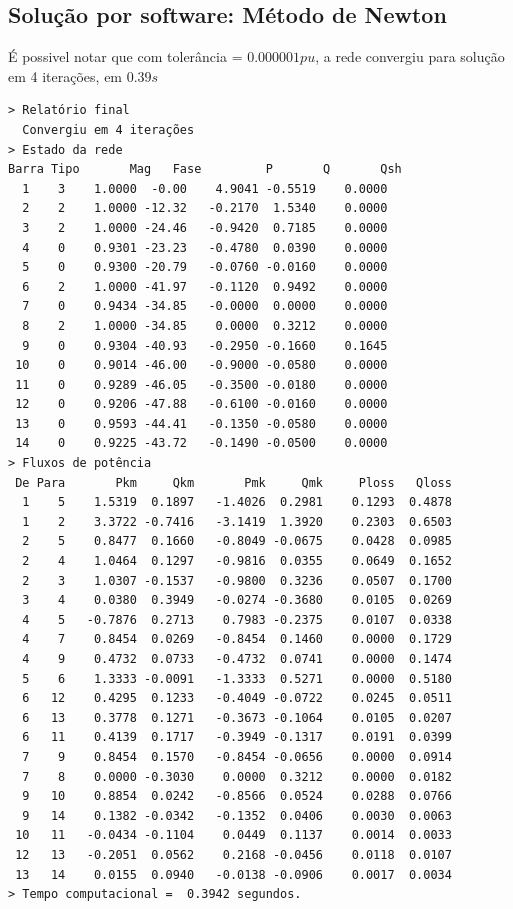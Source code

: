 \subsection{Solução por software: Método de Newton}
É possivel notar que com tolerância = $0.000001pu$, a rede convergiu para solução em 4 iterações, em $0.39s$
\begin{verbatim}
> Relatório final
  Convergiu em 4 iterações
> Estado da rede
Barra Tipo       Mag   Fase         P       Q       Qsh
  1    3    1.0000  -0.00    4.9041 -0.5519    0.0000 
  2    2    1.0000 -12.32   -0.2170  1.5340    0.0000 
  3    2    1.0000 -24.46   -0.9420  0.7185    0.0000 
  4    0    0.9301 -23.23   -0.4780  0.0390    0.0000 
  5    0    0.9300 -20.79   -0.0760 -0.0160    0.0000 
  6    2    1.0000 -41.97   -0.1120  0.9492    0.0000 
  7    0    0.9434 -34.85   -0.0000  0.0000    0.0000 
  8    2    1.0000 -34.85    0.0000  0.3212    0.0000 
  9    0    0.9304 -40.93   -0.2950 -0.1660    0.1645 
 10    0    0.9014 -46.00   -0.9000 -0.0580    0.0000 
 11    0    0.9289 -46.05   -0.3500 -0.0180    0.0000 
 12    0    0.9206 -47.88   -0.6100 -0.0160    0.0000 
 13    0    0.9593 -44.41   -0.1350 -0.0580    0.0000 
 14    0    0.9225 -43.72   -0.1490 -0.0500    0.0000 
> Fluxos de potência
 De Para       Pkm     Qkm       Pmk     Qmk     Ploss   Qloss
  1    5    1.5319  0.1897   -1.4026  0.2981    0.1293  0.4878
  1    2    3.3722 -0.7416   -3.1419  1.3920    0.2303  0.6503
  2    5    0.8477  0.1660   -0.8049 -0.0675    0.0428  0.0985
  2    4    1.0464  0.1297   -0.9816  0.0355    0.0649  0.1652
  2    3    1.0307 -0.1537   -0.9800  0.3236    0.0507  0.1700
  3    4    0.0380  0.3949   -0.0274 -0.3680    0.0105  0.0269
  4    5   -0.7876  0.2713    0.7983 -0.2375    0.0107  0.0338
  4    7    0.8454  0.0269   -0.8454  0.1460    0.0000  0.1729
  4    9    0.4732  0.0733   -0.4732  0.0741    0.0000  0.1474
  5    6    1.3333 -0.0091   -1.3333  0.5271    0.0000  0.5180
  6   12    0.4295  0.1233   -0.4049 -0.0722    0.0245  0.0511
  6   13    0.3778  0.1271   -0.3673 -0.1064    0.0105  0.0207
  6   11    0.4139  0.1717   -0.3949 -0.1317    0.0191  0.0399
  7    9    0.8454  0.1570   -0.8454 -0.0656    0.0000  0.0914
  7    8    0.0000 -0.3030    0.0000  0.3212    0.0000  0.0182
  9   10    0.8854  0.0242   -0.8566  0.0524    0.0288  0.0766
  9   14    0.1382 -0.0342   -0.1352  0.0406    0.0030  0.0063
 10   11   -0.0434 -0.1104    0.0449  0.1137    0.0014  0.0033
 12   13   -0.2051  0.0562    0.2168 -0.0456    0.0118  0.0107
 13   14    0.0155  0.0940   -0.0138 -0.0906    0.0017  0.0034
> Tempo computacional =  0.3942 segundos.
\end{verbatim}

